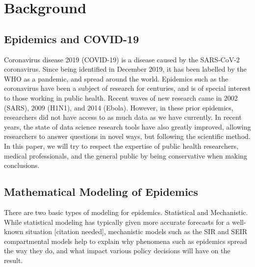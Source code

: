 \documentclass[12pt, a4, epsf] {article}
\theoremstyle{plain}
\theoremstyle{definition}
\begin{document}
\section{Background}
\subsection{Epidemics and COVID-19}
Coronavirus disease 2019 (COVID-19) is a disease caused by the SARS-CoV-2 coronavirus. Since being identified in December 2019, it has been labelled by the WHO as a pandemic, and spread around the world. Epidemics such as the coronavirus have been a subject of research for centuries, and is of special interest to those working in public health. Recent waves of new research came in 2002 (SARS), 2009 (H1N1), and 2014 (Ebola). However, in these prior epidemics, researchers did not have access to as much data as we have currently. In recent years, the state of data science research tools have also greatly improved, allowing researchers to answer questions in novel ways, but following the scientific method. In this paper, we will try to respect the expertise of public health researchers, medical professionals, and the general public by being conservative when making conclusions.

\subsection{Mathematical Modeling of Epidemics}
There are two basic types of modeling for epidemics. Statistical and Mechanistic. While statistical modeling has typically given more accurate forecasts for a well-known situation [citation needed], mechanistic models such as the SIR and SEIR compartmental models help to explain why phenomena such as epidemics spread the way they do, and what impact various policy decisions will have on the result.
\end{document}

